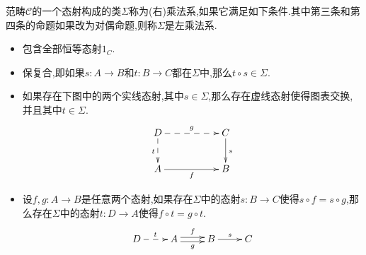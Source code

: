 范畴$\mathscr{C}$的一个态射构成的类$\Sigma$称为(右)乘法系,如果它满足如下条件.其中第三条和第四条的命题如果改为对偶命题,则称$\Sigma$是左乘法系.
\begin{itemize}
	\item 包含全部恒等态射$1_C$.
	\item 保复合,即如果$s:A\to B$和$t:B\to C$都在$\Sigma$中,那么$t\circ s\in\Sigma$.
	\item 如果存在下图中的两个实线态射,其中$s\in\Sigma$,那么存在虚线态射使得图表交换,并且其中$t\in\Sigma$.
	$$\xymatrix{D\ar@{-->}[rr]^g\ar@{-->}[d]_t&&C\ar[d]^s\\A\ar[rr]_f&&B}$$
	\item 设$f,g:A\to B$是任意两个态射,如果存在$\Sigma$中的态射$s:B\to C$使得$s\circ f=s\circ g$,那么存在$\Sigma$中的态射$t:D\to A$使得$f\circ t=g\circ t$.
	$$\xymatrix{D\ar@{-->}[r]^t&A\ar@<0.5ex>[r]^f\ar@<-0.5ex>[r]_g&B\ar[r]^s&C}$$
\end{itemize}
